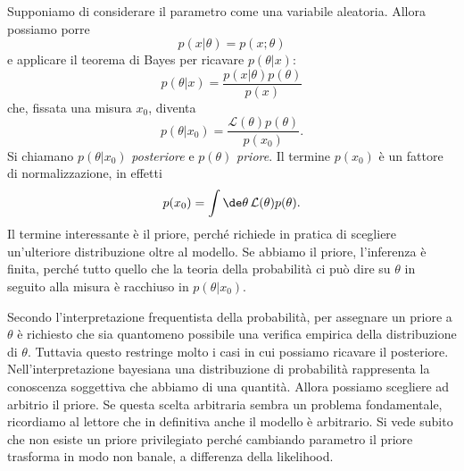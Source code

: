Supponiamo di considerare il parametro come una variabile aleatoria.
Allora possiamo porre
\begin{equation*}
	p(x|\theta) = p(x;\theta)
\end{equation*}
e applicare il teorema di Bayes per ricavare $p(\theta|x)$:
\begin{equation*}
	p(\theta|x) = \frac{p(x|\theta)p(\theta)}{p(x)}
\end{equation*}
che, fissata una misura $x_0$, diventa
\begin{equation*}
	p(\theta|x_0) = \frac{\mathcal L(\theta) p(\theta)}{p(x_0)}.
\end{equation*}
Si chiamano $p(\theta|x_0)$ \emph{posteriore} e $p(\theta)$ \emph{priore}.
Il termine $p(x_0)$ è un fattore di normalizzazione, in effetti
\begin{equation*}
	p(x_0) = \int \de \theta\, \mathcal L(\theta) p(\theta).
\end{equation*}
Il termine interessante è il priore, perché richiede in pratica di scegliere un'ulteriore distribuzione oltre al modello.
Se abbiamo il priore, l'inferenza è finita, perché tutto quello che la teoria della probabilità ci può dire su $\theta$ in seguito alla misura è racchiuso in $p(\theta|x_0)$.


Secondo l'interpretazione frequentista della probabilità,
per assegnare un priore a $\theta$ è richiesto che sia quantomeno possibile una verifica empirica della distribuzione di $\theta$.
Tuttavia questo restringe molto i casi in cui possiamo ricavare il posteriore.
Nell'interpretazione bayesiana una distribuzione di probabilità rappresenta la conoscenza soggettiva che abbiamo di una quantità.
Allora possiamo scegliere ad arbitrio il priore.
Se questa scelta arbitraria sembra un problema fondamentale,
ricordiamo al lettore che in definitiva anche il modello è arbitrario.
Si vede subito che non esiste un priore privilegiato perché cambiando parametro il priore trasforma in modo non banale, a differenza della likelihood.

